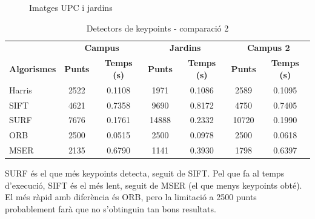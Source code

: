 \begin{figure}[!htb]
				\label{fig:awesome_image3}
			\endminipage
			\caption{Imatges UPC i jardins}
		\end{figure}

		\begin{table}[H]
			\begin{center}
				\begin{tabular}{l | c c | c c | c c}
					& \multicolumn{2}{c|}{\textbf{Campus}} & \multicolumn{2}{c|}{\textbf{Jardins}} & \multicolumn{2}{c}{\textbf{Campus 2}} \\
					\textbf{Algorismes} & \textbf{Punts} & \textbf{Temps (s)} & \textbf{Punts} & \textbf{Temps (s)} & \textbf{Punts} & \textbf{Temps (s)} \\ \hline
					Harris & 2522 & 0.1108 & 1971 & 0.1086 & 2589 & 0.1095 \\
					SIFT & 4621 & 0.7358 & 9690 & 0.8172 & 4750 & 0.7405 \\
					SURF & 7676 & 0.1761 & 14888 & 0.2332 & 10720 & 0.1990 \\
					ORB & 2500 & 0.0515 & 2500 & 0.0978 & 2500 & 0.0618 \\
					MSER & 2135 & 0.6790 & 1141 & 0.3930 & 1798 & 0.6397 \\
				\end{tabular}
			\end{center}
			\caption{Detectors de keypoints - comparació 2}
		\end{table}
		\noindent
		SURF és el que més keypoints detecta, seguit de SIFT. Pel que fa al temps d'execució, SIFT és el més lent, seguit de MSER (el que menys keypoints obté). El més ràpid amb diferència és ORB, pero la
		limitació a 2500 punts probablement farà que no s'obtinguin tan bons resultats.

